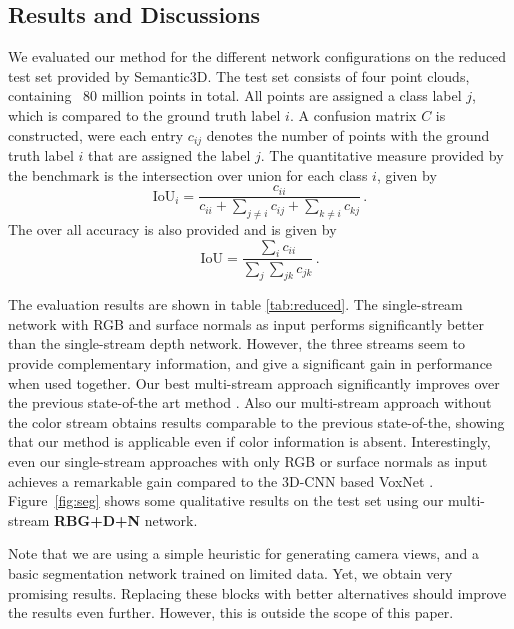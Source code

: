 \documentclass[runningheads,a4paper]{llncs}
\begin{document}
\subsection{Results and Discussions}
We evaluated our method for the different network configurations on the reduced test set provided by Semantic3D. The test set consists of four point clouds, containing ~80 million points in total. All points are assigned a class label $j$, which is compared to the ground truth label $i$. A confusion matrix $C$ is constructed, were each entry $c_{ij}$ denotes the number of points with the ground truth label $i$ that are assigned the label $j$. The quantitative measure provided by the benchmark \cite{hackel2017semantic3d} is the intersection over union for each class $i$, given by 
\begin{equation}
\text{IoU}_i = \frac{c_{ii}}{c_{ii}+\sum_{j \neq i} c_{ij} + \sum_{k \neq i} c_{kj}}\,.
\end{equation}
The over all accuracy is also provided and is given by
\begin{equation}
\text{IoU} = \frac{\sum_{i} c_{ii}}{\sum_{j}\sum_{jk} c_{jk}}\,.
\end{equation}

The evaluation results are shown in table \ref{tab:reduced}. The single-stream network with RGB and surface normals as input performs significantly better than the single-stream depth network. However, the three streams seem to provide complementary information, and give a significant gain in performance when used together. Our best multi-stream approach significantly improves over the previous state-of-the art method \cite{hackel2016fast}. Also our multi-stream approach without the color stream obtains results comparable to the previous state-of-the, showing that our method is applicable even if color information is absent. Interestingly, even our single-stream approaches with only RGB or surface normals as input achieves a remarkable gain compared to the 3D-CNN based VoxNet \cite{hackel2017semantic3d}. Figure~\ref{fig:seg} shows some qualitative results on the test set using our multi-stream {\bf RBG+D+N} network. 

Note that we are using a simple heuristic for generating camera views, and a basic segmentation network trained on limited data. Yet, we obtain very promising results. Replacing these blocks with better alternatives should improve the results even further. However, this is outside the scope of this paper.
\end{document}
